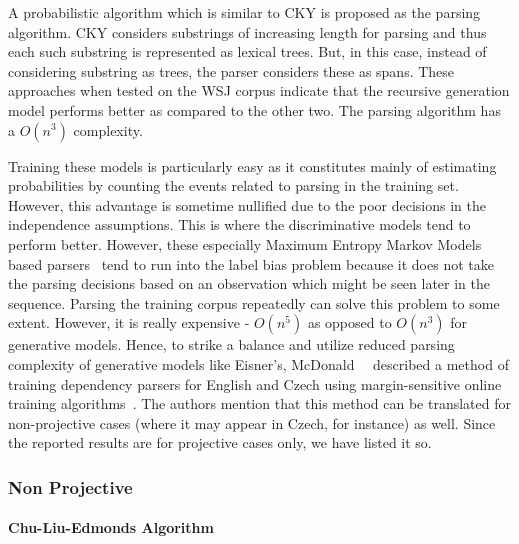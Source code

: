 A probabilistic algorithm which is similar to CKY is proposed as the parsing algorithm. CKY considers substrings of increasing length for parsing and thus each such substring is represented as lexical trees. But, in this case, instead of considering substring as trees, the parser considers these as spans. These approaches when tested on the WSJ corpus indicate that the recursive generation model performs better as compared to the other two. The parsing algorithm has a $O(n^3)$ complexity. 

Training these models is particularly easy as it constitutes mainly of estimating probabilities by counting the events related to parsing in the training set. However, this advantage is sometime nullified due to the poor decisions in the independence assumptions. This is where the discriminative models tend to perform better. However, these especially Maximum Entropy Markov Models based parsers~\citep{ratnaparkhi1999learning} tend to run into the label bias problem because it does not take the parsing decisions based on an observation which might be seen later in the sequence. Parsing the training corpus repeatedly can solve this problem to some extent. However, it is really expensive - $O(n^5)$ as opposed to $O(n^3)$ for generative models. Hence, to strike a balance and utilize reduced parsing complexity of generative models like Eisner's, McDonald~\etal~\citep{McDonald:2005:OLT:1219840.1219852} described a method of training dependency parsers for English and Czech using margin-sensitive online training algorithms~\citep{crammer2003ultraconservative,shalev2003online}. The authors mention that this method can be translated for non-projective cases (where it may appear in Czech, for instance) as well. Since the reported results are for projective cases only, we have listed it so.


\subsubsection{Non Projective}
\paragraph*{Chu-Liu-Edmonds Algorithm}

